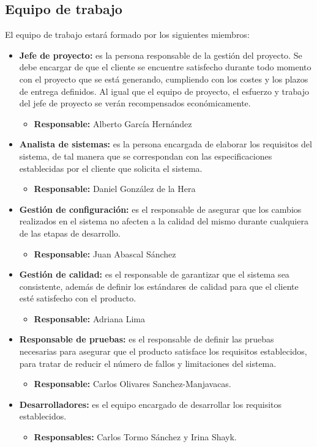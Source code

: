 \subsection{Equipo de trabajo}
\par El equipo de trabajo estará formado por los siguientes miembros:
\begin{itemize}
\item \textbf{Jefe de proyecto:} es la persona responsable de la gestión del proyecto. Se debe encargar de que el cliente se encuentre satisfecho durante todo momento con el proyecto que se está generando, cumpliendo con los costes y los plazos de entrega definidos. Al igual que el equipo de proyecto, el esfuerzo y trabajo del jefe de proyecto se verán recompensados económicamente.
  \begin{itemize}
  \item \textbf{Responsable:} Alberto García Hernández
  \end{itemize}
\item \textbf{Analista de sistemas:} es la persona encargada de elaborar los requisitos del sistema, de tal manera que se correspondan con las especificaciones establecidas por el cliente que solicita el sistema.
  \begin{itemize}
  \item \textbf{Responsable:} Daniel González de la Hera
  \end{itemize}
\item \textbf{Gestión de configuración:} es el responsable de asegurar que los cambios realizados en el sistema no afecten a la calidad del mismo durante cualquiera de las etapas de desarrollo. 
  \begin{itemize}
  \item \textbf{Responsable:} Juan Abascal Sánchez
  \end{itemize}
\item \textbf{Gestión de calidad:} es el responsable de garantizar que el sistema sea consistente, además de definir los estándares de calidad para que el cliente esté satisfecho con el producto.
  \begin{itemize}
  \item \textbf{Responsable:} Adriana Lima
  \end{itemize}
\item \textbf{Responsable de pruebas:} es el responsable de definir las pruebas necesarias para asegurar que el producto satisface los requisitos establecidos, para tratar de reducir el número de fallos y limitaciones del sistema.
  \begin{itemize}
  \item \textbf{Responsable:} Carlos Olivares Sanchez-Manjavacas.
  \end{itemize}
\item \textbf{Desarrolladores:} es el equipo encargado de desarrollar los requisitos establecidos.
  \begin{itemize}
  \item \textbf{Responsables:} Carlos Tormo Sánchez y Irina Shayk.
  \end{itemize}
\end{itemize}

